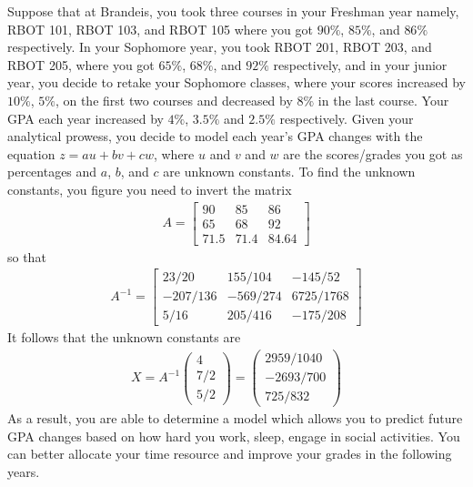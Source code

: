 \begin{example}
	\label{ex:mat_inv_lemma}
	Suppose that at Brandeis, you took three courses in your Freshman year namely, RBOT 101, RBOT 103, and RBOT 105 where you got $90\%$, $85\%$, and $86\%$ respectively. In your Sophomore year, you took  RBOT 201, RBOT 203, and RBOT 205, where you got $65\%$, $68\%$, and $92\%$ respectively, and in your junior year, you decide to retake your Sophomore classes, where your scores increased by $10\%$, $5\%$, on the first two courses and decreased by $8\%$ in the last course. Your GPA each year increased by $4\%$, $3.5\%$ and $2.5\%$  respectively. Given your analytical prowess, you decide to model each year's GPA changes with the equation $z = a u + b v + c w$, where $u$ and $v$ and $w$ are the scores/grades you got as percentages and $a$, $b$, and $c$ are unknown constants. To find the unknown constants, you figure you need to invert the matrix
	\begin{align}
		A = \begin{bmatrix}
			90 & 85 & 86 \\
			65 & 68 & 92 \\
			71.5 & 71.4 & 84.64
		\end{bmatrix}
	\end{align}
	so that 
	\begin{align}
	A^{-1} = \begin{bmatrix}
	23/20 & 155/104 & -145/52 \\
	-207/136 & -569/274 & 6725/1768 \\
	5/16 & 205/416 & -175/208
	\end{bmatrix}
	\end{align}
	It follows that the unknown constants are 
	\begin{align}
		X = A^{-1} \left(\begin{array}{c}
			4 \\ 7/2 \\ 5/2
		\end{array}\right) = \left(\begin{array}{c}
		2959/1040 \\ -2693/700 \\ 725/832
		\end{array}\right) 
	\end{align}
	As a result, you are able to determine a model which allows you to predict future GPA changes based on how hard you work, sleep, engage in social activities. You can better allocate your time resource and improve your grades in the following years.
	

\end{example}
